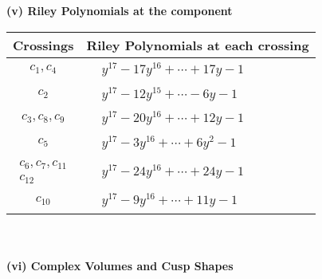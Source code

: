\documentclass[1p]{elsarticle_modified}
\theoremstyle{definition}
\begin{document}
\newpage\renewcommand{\arraystretch}{1}
\flushleft \textbf{(v) Riley Polynomials at the component}\newline \\
\begin{tabular}{m{50pt}|m{274pt}}
Crossings & \hspace{64pt}Riley Polynomials at each crossing \\
\hline $$\begin{aligned}c_{1},c_{4}\end{aligned}$$&$\begin{aligned}
&y^{17}-17 y^{16}+\cdots+17 y-1
\end{aligned}$\\
\hline $$\begin{aligned}c_{2}\end{aligned}$$&$\begin{aligned}
&y^{17}-12 y^{15}+\cdots-6 y-1
\end{aligned}$\\
\hline $$\begin{aligned}c_{3},c_{8},c_{9}\end{aligned}$$&$\begin{aligned}
&y^{17}-20 y^{16}+\cdots+12 y-1
\end{aligned}$\\
\hline $$\begin{aligned}c_{5}\end{aligned}$$&$\begin{aligned}
&y^{17}-3 y^{16}+\cdots+6 y^2-1
\end{aligned}$\\
\hline $$\begin{aligned}c_{6},c_{7},c_{11}\\c_{12}\end{aligned}$$&$\begin{aligned}
&y^{17}-24 y^{16}+\cdots+24 y-1
\end{aligned}$\\
\hline $$\begin{aligned}c_{10}\end{aligned}$$&$\begin{aligned}
&y^{17}-9 y^{16}+\cdots+11 y-1
\end{aligned}$\\
\hline
\end{tabular}\\~\\
\newpage\flushleft \textbf{(vi) Complex Volumes and Cusp Shapes}
\end{document}
